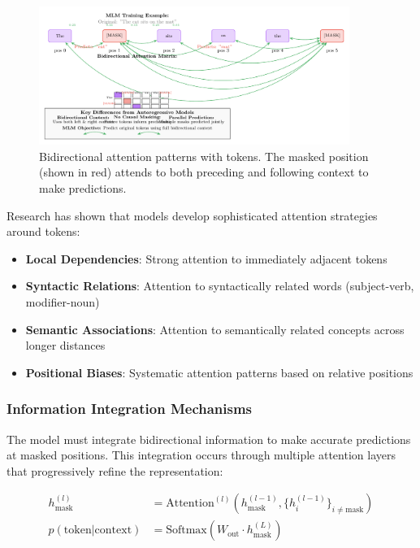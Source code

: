 \begin{figure}[htbp]
\centering
\includegraphics[width=0.9\textwidth]{part1/chapter03/fig_mask_attention.pdf}
\caption{Bidirectional attention patterns with \mask{} tokens. The masked position (shown in red) attends to both preceding and following context to make predictions.}
\label{fig:mask_attention}
\end{figure}

Research has shown that models develop sophisticated attention strategies around \mask{} tokens:

\begin{itemize}
\item \textbf{Local Dependencies}: Strong attention to immediately adjacent tokens
\item \textbf{Syntactic Relations}: Attention to syntactically related words (subject-verb, modifier-noun)
\item \textbf{Semantic Associations}: Attention to semantically related concepts across longer distances
\item \textbf{Positional Biases}: Systematic attention patterns based on relative positions
\end{itemize}

\subsubsection{Information Integration Mechanisms}

The model must integrate bidirectional information to make accurate predictions at masked positions. This integration occurs through multiple attention layers that progressively refine the representation:

\begin{align}
h_{\text{mask}}^{(l)} &= \text{Attention}^{(l)}(h_{\text{mask}}^{(l-1)}, \{h_i^{(l-1)}\}_{i \neq \text{mask}}) \\
p(\text{token} | \text{context}) &= \text{Softmax}(W_{\text{out}} \cdot h_{\text{mask}}^{(L)})
\end{align}

